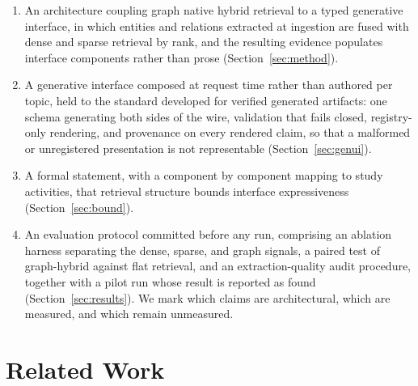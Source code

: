 \documentclass[conference]{IEEEtran}
\begin{document}
\begin{enumerate}
\item An architecture coupling graph native hybrid retrieval to a typed generative interface, in which entities and relations extracted at ingestion are fused with dense and sparse retrieval by rank, and the resulting evidence populates interface components rather than prose (Section~\ref{sec:method}).
\item A generative interface composed at request time rather than authored per topic, held to the standard developed for verified generated artifacts: one schema generating both sides of the wire, validation that fails closed, registry-only rendering, and provenance on every rendered claim, so that a malformed or unregistered presentation is not representable (Section~\ref{sec:genui}).
\item A formal statement, with a component by component mapping to study activities, that retrieval structure bounds interface expressiveness (Section~\ref{sec:bound}).
\item An evaluation protocol committed before any run, comprising an ablation harness separating the dense, sparse, and graph signals, a paired test of graph-hybrid against flat retrieval, and an extraction-quality audit procedure, together with a pilot run whose result is reported as found (Section~\ref{sec:results}). We mark which claims are architectural, which are measured, and which remain unmeasured.
\end{enumerate}

\section{Related Work}
\end{document}
